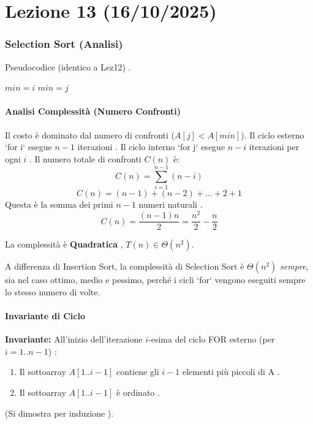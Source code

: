 
\part{Lezione 13 (16/10/2025) }

\section{Selection Sort (Analisi) }
Pseudocodice (identico a Lez12) .
\begin{algorithmic}[1]
        \State $min = i$
         
                \State $min = j$ 
            \EndIf
        \EndFor
        \State {} 
    \EndFor
\EndProcedure
\end{algorithmic}

\subsection{Analisi Complessità (Numero Confronti) }
Il costo è dominato dal numero di confronti ($A[j] < A[min]$).
Il ciclo esterno `for i` esegue $n-1$ iterazioni .
Il ciclo interno `for j` esegue $n-i$ iterazioni per ogni $i$ .
Il numero totale di confronti $C(n)$ è:
\[ C(n) = \sum_{i=1}^{n-1} (n-i) \]
\[ C(n) = (n-1) + (n-2) + \dots + 2 + 1 \]
Questa è la somma dei primi $n-1$ numeri naturali .
\[ C(n) = \frac{(n-1)n}{2} = \frac{n^2}{2} - \frac{n}{2} \]

La complessità è \textbf{Quadratica} , $T(n) \in \Theta(n^2)$.


\begin{observation}
A differenza di Insertion Sort, la complessità di Selection Sort è $\Theta(n^2)$ \emph{sempre}, sia nel caso ottimo, medio e pessimo, perché i cicli `for` vengono eseguiti sempre lo stesso numero di volte.
\end{observation}

\subsection{Invariante di Ciclo }

\begin{definition}
\textbf{Invariante:} All'inizio dell'iterazione $i$-esima del ciclo FOR esterno (per $i=1..n-1$) :
\begin{enumerate}
    \item Il sottoarray $A[1..i-1]$ contiene gli $i-1$ elementi più piccoli di A .
    \item Il sottoarray $A[1..i-1]$ è ordinato .
\end{enumerate}
(Si dimostra per induzione ).
\end{definition}

